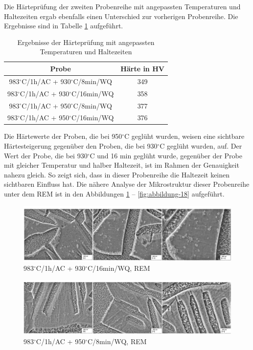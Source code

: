 Die Härteprüfung der zweiten Probenreihe mit angepassten Temperaturen und Haltezeiten ergab ebenfalls einen Unterschied zur vorherigen Probenreihe. Die Ergebnisse sind in Tabelle \ref{Tabelle 7} aufgeführt.

\begin{table}
	\centering
	\begin{tabular}{|c|c|}
		\hline 
		Probe & Härte in HV \\ 
		\hline 
		983$^\circ$C/1h/AC + 930$^\circ$C/8min/WQ & 349 \\ 
		\hline 
		983$^\circ$C/1h/AC + 930$^\circ$C/16min/WQ & 358 \\ 
		\hline 
		983$^\circ$C/1h/AC + 950$^\circ$C/8min/WQ & 377 \\ 
		\hline 
		983$^\circ$C/1h/AC + 950$^\circ$C/16min/WQ & 376 \\ 
		\hline 
	\end{tabular} 
	\caption{Ergebnisse der Härteprüfung mit angepassten Temperaturen und Haltezeiten}
	\label{Tabelle 7}
\end{table}

Die Härtewerte der Proben, die bei 950$^\circ$C geglüht wurden, weisen eine sichtbare Härtesteigerung gegenüber den Proben, die bei 930$^\circ$C geglüht wurden, auf. Der Wert der Probe, die bei 930$^\circ$C und 16 min geglüht wurde, gegenüber der Probe mit gleicher Temperatur und halber Haltezeit, ist im Rahmen der Genauigkeit nahezu gleich. So zeigt sich, dass in dieser Probenreihe die Haltezeit keinen sichtbaren Einfluss hat. Die nähere Analyse der Mikrostruktur dieser Probenreihe unter dem REM ist in den Abbildungen \ref{fig:abbildung-16} -- \ref{fig:abbildung-18} aufgeführt.

\begin{figure}
	\centering
	\includegraphics[width=1.0\linewidth]{./Bilder/Abbildung 16}
	\caption[Abbildung 16]{983$^\circ$C/1h/AC + 930$^\circ$C/16min/WQ, REM}
	\label{fig:abbildung-16}
\end{figure}

\begin{figure}
	\centering
	\includegraphics[width=1.0\linewidth]{./Bilder/Abbildung 17}
	\caption[Abbildung 17]{983$^\circ$C/1h/AC + 950$^\circ$C/8min/WQ, REM}
	\label{fig:abbildung-17}
\end{figure}

